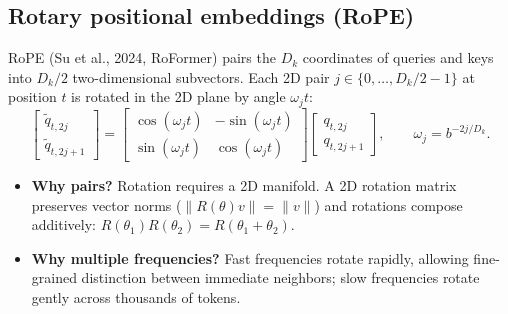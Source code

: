 \documentclass[11pt,a4paper]{article}
\newcommand{\slides}[1]{\par\nopagebreak\noindent{\normalfont\small\emph{(slides #1)}}\par\nopagebreak\vspace{2pt}}
\theoremstyle{definition}
\theoremstyle{plain}
\begin{document}
\subsection{Rotary positional embeddings (RoPE)}\slides{52 / 84}
RoPE (Su et al., 2024, RoFormer) pairs the $D_k$ coordinates of queries and keys into $D_k/2$ two-dimensional subvectors. Each 2D pair $j \in \{0, \dots, D_k/2 - 1\}$ at position $t$ is rotated in the 2D plane by angle $\omega_j t$:
\begin{equation}\label{eq:rope_pair}
\begin{bmatrix} \tilde{q}_{t, 2j} \\ \tilde{q}_{t, 2j+1} \end{bmatrix} = \begin{bmatrix} \cos(\omega_j t) & -\sin(\omega_j t) \\ \sin(\omega_j t) & \cos(\omega_j t) \end{bmatrix} \begin{bmatrix} q_{t, 2j} \\ q_{t, 2j+1} \end{bmatrix}, \qquad \omega_j = b^{-2j/D_k}.
\end{equation}
\begin{itemize}[nosep]
\item \textbf{Why pairs?} Rotation requires a 2D manifold. A 2D rotation matrix preserves vector norms ($\|R(\theta) v\| = \|v\|$) and rotations compose additively: $R(\theta_1) R(\theta_2) = R(\theta_1 + \theta_2)$.
\item \textbf{Why multiple frequencies?} Fast frequencies rotate rapidly, allowing fine-grained distinction between immediate neighbors; slow frequencies rotate gently across thousands of tokens.
\end{itemize}
\end{document}
